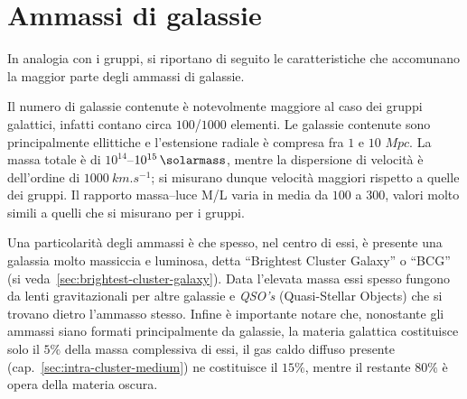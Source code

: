 \section{Ammassi di galassie}\label{sec:ammassi-di-galassie}
In analogia con i gruppi, si riportano di seguito le caratteristiche che accomunano la maggior parte degli ammassi di galassie.

\noindent Il numero di galassie contenute è notevolmente maggiore al caso dei gruppi galattici, infatti contano circa $100$/$1000$ elementi. Le galassie contenute sono principalmente ellittiche e l’estensione radiale è compresa fra $1$ e $10$ $\si{Mpc}$.
La massa totale è di $10^{14}$--$10^{15}\, \si{\solarmass}$, mentre la dispersione di velocità è dell'ordine di $\SI{1000}{km.s^{-1}}$; si misurano dunque velocità maggiori rispetto a quelle dei gruppi.
Il rapporto massa--luce M/L varia in media da $100$ a $300$, valori molto simili a quelli che si misurano per i gruppi.

\noindent Una particolarità degli ammassi è che spesso, nel centro di essi, è presente una galassia molto massiccia e luminosa, detta “Brightest Cluster Galaxy” o “BCG” (si veda~\ref{sec:brightest-cluster-galaxy}).
Data l’elevata massa essi spesso fungono da lenti gravitazionali per altre galassie e \emph{QSO's} (Quasi-Stellar Objects) che si trovano dietro l’ammasso stesso.
Infine è importante notare che, nonostante gli ammassi siano formati principalmente da galassie, la materia galattica costituisce solo il $5\%$ della massa complessiva di essi, il gas caldo diffuso presente (cap.~\ref{sec:intra-cluster-medium}) ne costituisce il $15\%$, mentre il restante $80\%$ è opera della materia oscura.


